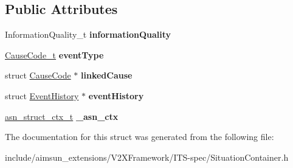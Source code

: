 \subsection*{Public Attributes}
\begin{DoxyCompactItemize}
\item 
Information\+Quality\+\_\+t {\bfseries information\+Quality}\hypertarget{structSituationContainer_a1de95270f267eeeee82521910c594361}{}\label{structSituationContainer_a1de95270f267eeeee82521910c594361}

\item 
\hyperlink{structCauseCode}{Cause\+Code\+\_\+t} {\bfseries event\+Type}\hypertarget{structSituationContainer_ad991ea1bda2cb60aa8c801b6742a46e8}{}\label{structSituationContainer_ad991ea1bda2cb60aa8c801b6742a46e8}

\item 
struct \hyperlink{structCauseCode}{Cause\+Code} $\ast$ {\bfseries linked\+Cause}\hypertarget{structSituationContainer_a9b737a95a09f760af4c8b24ad22a1e4c}{}\label{structSituationContainer_a9b737a95a09f760af4c8b24ad22a1e4c}

\item 
struct \hyperlink{structEventHistory}{Event\+History} $\ast$ {\bfseries event\+History}\hypertarget{structSituationContainer_af36cea7303075f8e105eaefd663103cc}{}\label{structSituationContainer_af36cea7303075f8e105eaefd663103cc}

\item 
\hyperlink{structasn__struct__ctx__s}{asn\+\_\+struct\+\_\+ctx\+\_\+t} {\bfseries \+\_\+asn\+\_\+ctx}\hypertarget{structSituationContainer_adcf22c8126a7422d6a61cd7e7bba819c}{}\label{structSituationContainer_adcf22c8126a7422d6a61cd7e7bba819c}

\end{DoxyCompactItemize}


The documentation for this struct was generated from the following file\+:\begin{DoxyCompactItemize}
\item 
include/aimsun\+\_\+extensions/\+V2\+X\+Framework/\+I\+T\+S-\/spec/Situation\+Container.\+h\end{DoxyCompactItemize}
